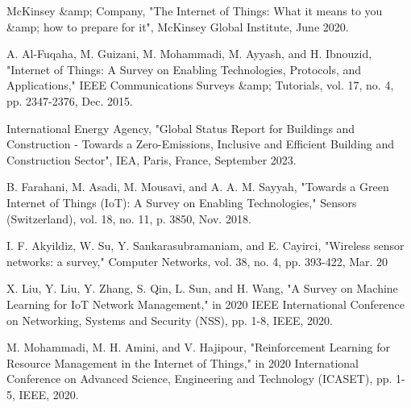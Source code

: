 \documentclass[11pt,a4paper]{article}
\begin{document}
\newpage
\begin{thebibliography}{99}

McKinsey \&amp; Company, "The Internet of Things: What it means to you \&amp; how to prepare for it", McKinsey Global Institute, June 2020.

A. Al-Fuqaha, M. Guizani, M. Mohammadi, M. Ayyash, and H. Ibnouzid, "Internet of Things: A Survey on Enabling Technologies, Protocols, and Applications," IEEE Communications Surveys \&amp; Tutorials, vol. 17, no. 4, pp. 2347-2376, Dec. 2015.

International Energy Agency, "Global Status Report for Buildings and Construction - Towards a Zero-Emissions, Inclusive and Efficient Building and Construction Sector", IEA, Paris, France, September 2023.

B. Farahani, M. Asadi, M. Mousavi, and A. A. M. Sayyah, "Towards a Green Internet of Things (IoT): A Survey on Enabling Technologies," Sensors (Switzerland), vol. 18, no. 11, p. 3850, Nov. 2018.

I. F. Akyildiz, W. Su, Y. Sankarasubramaniam, and E. Cayirci, "Wireless sensor networks: a survey," Computer Networks, vol. 38, no. 4, pp. 393-422, Mar. 20

X. Liu, Y. Liu, Y. Zhang, S. Qin, L. Sun, and H. Wang, "A Survey on Machine Learning for IoT Network Management," in 2020 IEEE International Conference on Networking, Systems and Security (NSS), pp. 1-8, IEEE, 2020.

M. Mohammadi, M. H. Amini, and V. Hajipour, "Reinforcement Learning for Resource Management in the Internet of Things," in 2020 International Conference on Advanced Science, Engineering and Technology (ICASET), pp. 1-5, IEEE, 2020.

\end{thebibliography}
\end{document}
